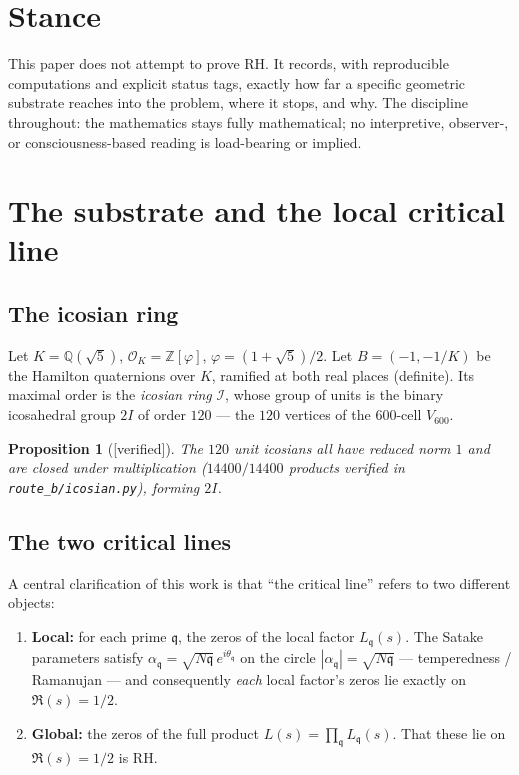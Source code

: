 \documentclass[11pt,a4paper]{article}
\newtheorem{proposition}[theorem]{Proposition}
\theoremstyle{definition}
\newcommand{\Q}{\mathbb{Q}}
\newcommand{\Z}{\mathbb{Z}}
\newcommand{\OK}{\mathcal{O}_K}
\newcommand{\TAGver}{{\small\textsf{[\textcolor{blue!60!black}{verified}]}}}
\begin{document}
\tableofcontents

\section{Stance}
This paper does not attempt to prove RH. It records, with reproducible
computations and explicit status tags, exactly how far a specific geometric
substrate reaches into the problem, where it stops, and why. The discipline
throughout: the mathematics stays fully mathematical; no interpretive,
observer-, or consciousness-based reading is load-bearing or implied.

\section{The substrate and the local critical line}\label{sec:local}

\subsection{The icosian ring}
Let $K=\Q(\sqrt5)$, $\OK=\Z[\varphi]$, $\varphi=(1+\sqrt5)/2$. Let
$B=(-1,-1/K)$ be the Hamilton quaternions over $K$, ramified at both real
places (definite). Its maximal order is the \emph{icosian ring} $\mathcal{I}$,
whose group of units is the binary icosahedral group $2I$ of order $120$ ---
the $120$ vertices of the $600$-cell $V_{600}$.

\begin{proposition}[\TAGver]\label{prop:icosian}
The $120$ unit icosians all have reduced norm $1$ and are closed under
multiplication ($14400/14400$ products verified in
\texttt{route\_b/icosian.py}), forming $2I$.
\end{proposition}

\subsection{The two critical lines}
A central clarification of this work is that ``the critical line'' refers to
two different objects:
\begin{enumerate}[label=(\arabic*)]
\item \textbf{Local:} for each prime $\mathfrak{q}$, the zeros of the local
factor $L_\mathfrak{q}(s)$. The Satake parameters satisfy
$\alpha_\mathfrak{q}=\sqrt{N\mathfrak{q}}\,e^{i\theta_\mathfrak{q}}$ on the
circle $|\alpha_\mathfrak{q}|=\sqrt{N\mathfrak{q}}$ --- temperedness /
Ramanujan --- and consequently \emph{each} local factor's zeros lie exactly
on $\Re(s)=1/2$.
\item \textbf{Global:} the zeros of the full product $L(s)=\prod_\mathfrak{q}
L_\mathfrak{q}(s)$. That these lie on $\Re(s)=1/2$ is RH.
\end{enumerate}
\end{document}

